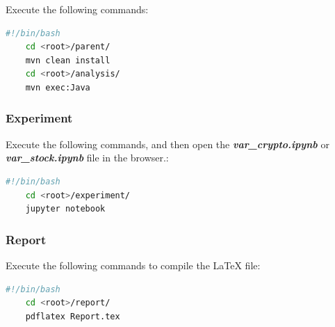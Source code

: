 \documentclass[11pt]{article} %
\theoremstyle{plain}
\theoremstyle{definition}
\begin{document}
Execute the following commands:

\begin{lstlisting}[language=bash]
    #!/bin/bash
    cd <root>/parent/
    mvn clean install
    cd <root>/analysis/
    mvn exec:Java
\end{lstlisting}

\subsubsection{Experiment}

Execute the following commands, and then open the \textsl{\textbf{var\_crypto.ipynb}} or \textsl{\textbf{var\_stock.ipynb}} file in the browser.:

\begin{lstlisting}[language=bash]
    #!/bin/bash
    cd <root>/experiment/
    jupyter notebook
\end{lstlisting}

\subsubsection{Report}

Execute the following commands to compile the LaTeX file:

\begin{lstlisting}[language=bash]
    #!/bin/bash
    cd <root>/report/
    pdflatex Report.tex
\end{lstlisting}



\end{document}

